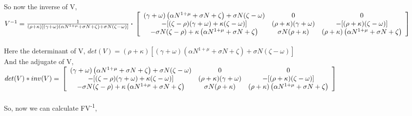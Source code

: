 So now the inverse of V, \\

$
V^{-1}=\frac{1}{(\rho+\kappa)\left[(\gamma+\omega)\left(\alpha N^{1+\mu}+\sigma N+\zeta\right)+\sigma N(\zeta-\omega)\right]} \boldsymbol{\cdot} \\
\\
\left[\begin{array}{ccc}
(\gamma+\omega)\left(\alpha N^{1+\mu}+\sigma N+\zeta\right)+\sigma N(\zeta-\omega) & 0 & 0 \\
-[(\zeta-\rho)(\gamma+\omega)+\kappa(\zeta-\omega)] & (\rho+\kappa)(\gamma+\omega) & -[(\rho+\kappa)(\zeta-\omega)] \\
-\sigma N(\zeta-\rho)+\kappa\left(\alpha N^{1+\mu}+\sigma N+\zeta\right) & \sigma N(\rho+\kappa) & (\rho+\kappa)\left(\alpha N^{1+\mu}+\sigma N+\zeta\right)
\end{array}\right]
$
\\
\\

Here the determinant of V, $ det(V) = (\rho+\kappa)\left[(\gamma+\omega)\left(\alpha N^{1+\mu}+\sigma N+\zeta\right)+\sigma N(\zeta-\omega)\right] $ \\

And the adjugate of V, \\

$
det(V)*inv(V) = \\
\left[\begin{array}{ccc}
(\gamma+\omega)\left(\alpha N^{1+\mu}+\sigma N+\zeta\right)+\sigma N(\zeta-\omega) & 0 & 0 \\
-[(\zeta-\rho)(\gamma+\omega)+\kappa(\zeta-\omega)] & (\rho+\kappa)(\gamma+\omega) & -[(\rho+\kappa)(\zeta-\omega)] \\
-\sigma N(\zeta-\rho)+\kappa\left(\alpha N^{1+\mu}+\sigma N+\zeta\right) & \sigma N(\rho+\kappa) & (\rho+\kappa)\left(\alpha N^{1+\mu}+\sigma N+\zeta\right)
\end{array}\right]
$
\\
\\

So, now we can calculate FV\textsuperscript{-1}, \\

